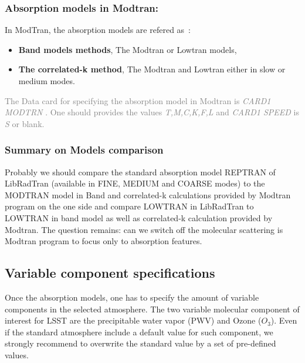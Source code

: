\documentclass[a4paper]{article}
\begin{document}
\subsubsection{Absorption models in Modtran:}
In ModTran, the absorption models are refered as~:
\begin{itemize}
\item {\bf Band models methods}, The Modtran or Lowtran models,
\item {\bf The correlated-k method}, The Modtran and Lowtran either in slow or medium modes.
\end{itemize} 


\textcolor{gray}{The Data card for specifying the absorption model in Modtran is  \textit{CARD1 MODTRN } . One should provides the values \textit{T,M,C,K,F,L} and \textit{CARD1 SPEED} is \textit{S} or blank. }



\subsubsection{Summary on Models comparison}
Probably we should compare the standard absorption model REPTRAN of LibRadTran (available in FINE, MEDIUM and COARSE modes) to the MODTRAN model in Band and correlated-k calculations provided by Modtran program on the one side and compare LOWTRAN in LibRadTran to LOWTRAN in band model as well as correlated-k calculation provided by Modtran.
The question remains: can we switch off the molecular scattering is Modtran program to focus only to absorption features.

\subsection{Variable component specifications}


Once the absorption models, one has to specify the amount of variable components in the selected atmosphere.
The two variable molecular component of interest for LSST are the precipitable water vapor (PWV) and Ozone ($O_3$).
Even if the standard atmosphere include a default value for such component, we strongly recommend to overwrite the standard value by a set of pre-defined values.
\end{document}
